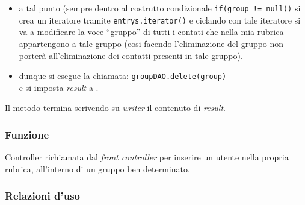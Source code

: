 \begin{description}
\begin{itemize}
		\item a tal punto (sempre dentro al costrutto condizionale \texttt{if(group != null))} si crea un iteratore tramite \texttt{entrys.iterator()} e ciclando con tale iteratore si va a modificare la voce ``gruppo'' di tutti i contati che nella mia rubrica appartengono a tale gruppo (cosi facendo l'eliminazione del gruppo non porterà all'eliminazione dei contatti presenti in tale gruppo).
		\item dunque si esegue la chiamata:
		\verb|groupDAO.delete(group)|\\
		e si imposta \textit{result} a .
	\end{itemize}
	Il metodo termina scrivendo su \textit{writer} il contenuto di \textit{result}.
	
\end{description}



\subsubsection*{Funzione}
Controller richiamata dal \textit{front controller} per inserire un utente nella propria rubrica, all'interno di un gruppo ben determinato.

\subsubsection*{Relazioni d'uso}

